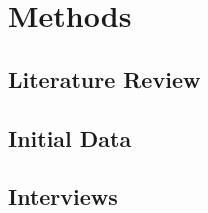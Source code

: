 \section{Methods}
\label{sec:methods}

\blindtext

\subsection{Literature Review}
\label{subsec:lit_review}

\blindtext


\subsection{Initial Data}
\label{subsec:init_data}

\blindtext


\subsection{Interviews}
\label{subsec:interviews}

\blindtext